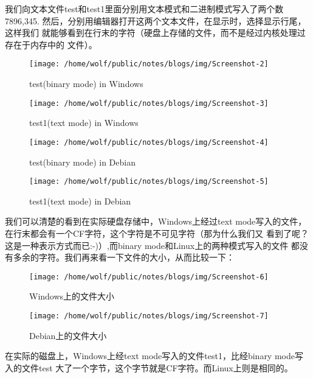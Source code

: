 \documentclass[11pt]{article}
\begin{document}
我们向文本文件test和test1里面分别用文本模式和二进制模式写入了两个数7896,345.
然后，分别用编辑器打开这两个文本文件，在显示时，选择显示行尾，这样我们
就能够看到在行末的字符（硬盘上存储的文件，而不是经过内核处理过存在于内存中的
文件）。\\

\begin{figure}
\texttt{[image: /home/wolf/public/notes/blogs/img/Screenshot-2]}
\caption{test(binary mode) in Windows}
\label{test(binary mode in windows}
\end{figure}
\begin{figure}
\texttt{[image: /home/wolf/public/notes/blogs/img/Screenshot-3]}
\caption{test1(text mode) in Windows}
\label{test1(text mode) in windows}
\end{figure}
\begin{figure}
\texttt{[image: /home/wolf/public/notes/blogs/img/Screenshot-4]}
\caption{test(binary mode) in Debian}
\label{test(binary mode) in Debian}
\end{figure}
\begin{figure}
\texttt{[image: /home/wolf/public/notes/blogs/img/Screenshot-5]}
\caption{test1(text mode) in Debian}

\label{test1(text mode) in Debian}
\end{figure}

我们可以清楚的看到在实际硬盘存储中，Windows上经过text
mode写入的文件，在行末都会有一个CF字符，这个字符是不可见字符（那为什么我们又
看到了呢？这是一种表示方式而已:-)）,而binary mode和Linux上的两种模式写入的文件
都没有多余的字符。我们再来看一下文件的大小，从而比较一下：
\begin{figure}
\texttt{[image: /home/wolf/public/notes/blogs/img/Screenshot-6]}
\caption{Windows上的文件大小}
\end{figure}
\begin{figure}
\texttt{[image: /home/wolf/public/notes/blogs/img/Screenshot-7]}
\caption{Debian上的文件大小}
\end{figure}
在实际的磁盘上，Windows上经text mode写入的文件test1，比经binary
mode写入的文件test
大了一个字节，这个字节就是CF字符。而Linux上则是相同的。
\end{document}
